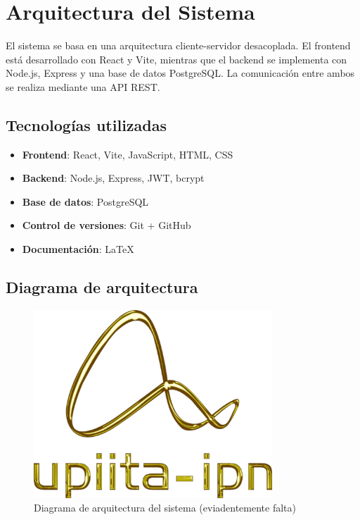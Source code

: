 \section{Arquitectura del Sistema}

El sistema se basa en una arquitectura cliente-servidor desacoplada. El frontend está desarrollado con React y Vite, mientras que el backend se implementa con Node.js, Express y una base de datos PostgreSQL. La comunicación entre ambos se realiza mediante una API REST.

\subsection{Tecnologías utilizadas}
\begin{itemize}
  \item \textbf{Frontend}: React, Vite, JavaScript, HTML, CSS
  \item \textbf{Backend}: Node.js, Express, JWT, bcrypt
  \item \textbf{Base de datos}: PostgreSQL
  \item \textbf{Control de versiones}: Git + GitHub
  \item \textbf{Documentación}: LaTeX
\end{itemize}

\subsection{Diagrama de arquitectura}

\begin{figure}[H]
  \centering
  \includegraphics[width=0.8\textwidth]{img/logo-upiita.png}
  \caption{Diagrama de arquitectura del sistema (eviadentemente falta)}
\end{figure}
